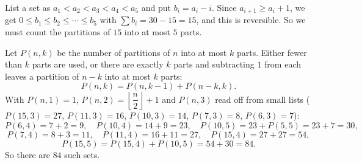 List a set as $a_1<a_2<a_3<a_4<a_5$ and put $b_i=a_i-i$. Since $a_{i+1}\ge a_i+1$, we get $0\le b_1\le b_2\le\cdots\le b_5$ with $\sum b_i=30-15=15$, and this is reversible. So we must count the partitions of $15$ into at most $5$ parts.

Let $P(n,k)$ be the number of partitions of $n$ into at most $k$ parts. Either fewer than $k$ parts are used, or there are exactly $k$ parts and subtracting $1$ from each leaves a partition of $n-k$ into at most $k$ parts:
\[P(n,k)=P(n,k-1)+P(n-k,k).\]
With $P(n,1)=1$, $P(n,2)=\left\lfloor\dfrac n2\right\rfloor+1$ and $P(n,3)$ read off from small lists ($P(15,3)=27$, $P(11,3)=16$, $P(10,3)=14$, $P(7,3)=8$, $P(6,3)=7$):
\[P(6,4)=7+2=9,\quad P(10,4)=14+9=23,\quad P(10,5)=23+P(5,5)=23+7=30,\]
\[P(7,4)=8+3=11,\quad P(11,4)=16+11=27,\quad P(15,4)=27+27=54,\]
\[P(15,5)=P(15,4)+P(10,5)=54+30=84.\]
So there are $\boxed{84}$ such sets.
